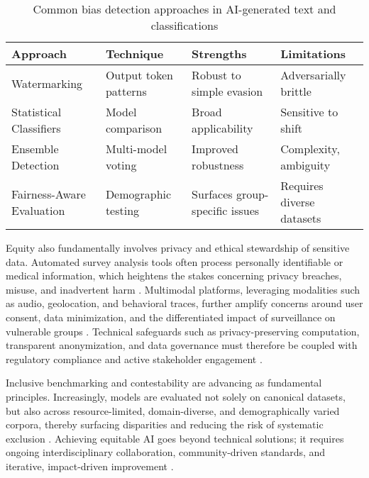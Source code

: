 \documentclass[sigconf]{acmart}
\begin{document}
\begin{table*}[htbp]
\centering
\caption{Common bias detection approaches in AI-generated text and classifications}
\label{tab:bias_detection_methods}
\begin{adjustbox}{max width=\textwidth}
\begin{tabular}{@{}llll@{}}
\toprule
\textbf{Approach}        & \textbf{Technique}       & \textbf{Strengths}              & \textbf{Limitations}        \\
\midrule
Watermarking             & Output token patterns    & Robust to simple evasion        & Adversarially brittle       \\
Statistical Classifiers  & Model comparison        & Broad applicability             & Sensitive to shift          \\
Ensemble Detection       & Multi-model voting      & Improved robustness             & Complexity, ambiguity       \\
Fairness-Aware Evaluation& Demographic testing     & Surfaces group-specific issues  & Requires diverse datasets   \\
\bottomrule
\end{tabular}
\end{adjustbox}
\end{table*}

Equity also fundamentally involves privacy and ethical stewardship of sensitive data. Automated survey analysis tools often process personally identifiable or medical information, which heightens the stakes concerning privacy breaches, misuse, and inadvertent harm \cite{ref7}\cite{ref10}\cite{ref14}\cite{ref45}\cite{ref53}\cite{ref80}\cite{ref82}\cite{ref89}\cite{ref100}. Multimodal platforms, leveraging modalities such as audio, geolocation, and behavioral traces, further amplify concerns around user consent, data minimization, and the differentiated impact of surveillance on vulnerable groups \cite{ref7}\cite{ref9}\cite{ref14}\cite{ref23}\cite{ref24}\cite{ref53}\cite{ref84}\cite{ref85}\cite{ref89}\cite{ref90}\cite{ref91}\cite{ref100}. Technical safeguards such as privacy-preserving computation, transparent anonymization, and data governance must therefore be coupled with regulatory compliance and active stakeholder engagement \cite{ref14}\cite{ref39}\cite{ref41}\cite{ref90}\cite{ref91}\cite{ref100}\cite{ref105}\cite{ref106}.

Inclusive benchmarking and contestability are advancing as fundamental principles. Increasingly, models are evaluated not solely on canonical datasets, but also across resource-limited, domain-diverse, and demographically varied corpora, thereby surfacing disparities and reducing the risk of systematic exclusion \cite{ref4}\cite{ref10}\cite{ref13}\cite{ref51}\cite{ref53}\cite{ref66}\cite{ref70}\cite{ref84}\cite{ref85}\cite{ref91}\cite{ref92}\cite{ref94}\cite{ref96}\cite{ref105}\cite{ref106}. Achieving equitable AI goes beyond technical solutions; it requires ongoing interdisciplinary collaboration, community-driven standards, and iterative, impact-driven improvement \cite{ref39}\cite{ref64}\cite{ref70}\cite{ref76}\cite{ref80}\cite{ref83}\cite{ref91}\cite{ref93}\cite{ref99}\cite{ref106}.
\end{document}
